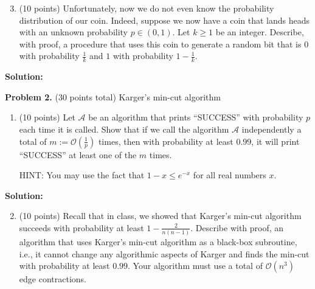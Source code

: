 \documentclass[11pt]{article}
\begin{document}
\begin{enumerate}
\setcounter{enumi}{2}
\item (10 points)
Unfortunately, now we do not even know the probability distribution of our coin. 
Indeed, suppose we now have a coin that lands heads with an unknown probability $p\in(0,1)$. 
Let $k\ge 1$ be an integer. 
Describe, with proof, a procedure that uses this coin to generate a random bit that is $0$ with probability $\frac{1}{k}$ and $1$ with probability $1-\frac{1}{k}$. 
\end{enumerate}

\noindent\textbf{Solution:}






\newpage\noindent
\textbf{Problem 2.} (30 points total)
Karger's min-cut algorithm
\begin{enumerate}
\item (10 points)
Let $\mathcal{A}$ be an algorithm that prints ``SUCCESS'' with probability $p$ each time it is called. 
Show that if we call the algorithm $\mathcal{A}$ independently a total of $m:=\mathcal{O}\left(\frac{1}{p}\right)$ times, then with probability at least $0.99$, it will print ``SUCCESS'' at least one of the $m$ times. 

\noindent
HINT: You may use the fact that $1-x\le e^{-x}$ for all real numbers $x$. 
\end{enumerate}

\noindent\textbf{Solution:}











\begin{enumerate}
\setcounter{enumi}{1}
\item (10 points)
Recall that in class, we showed that Karger's min-cut algorithm succeeds with probability at least $1-\frac{2}{n(n-1)}$. 
Describe with proof, an algorithm that uses Karger's min-cut algorithm as a black-box subroutine, i.e., it cannot change any algorithmic aspects of Karger and finds the min-cut with probability at least $0.99$. 
Your algorithm must use a total of $\mathcal{O}(n^3)$ edge contractions. 
\end{enumerate}
\end{document}
